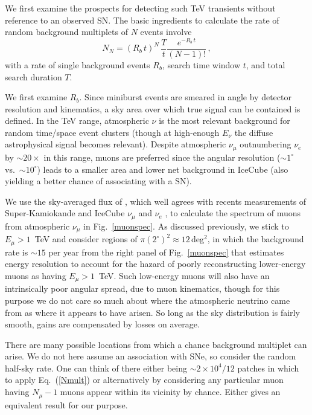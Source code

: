 \documentclass[aps,prd,nofootinbib,twocolumn,floatfix,letterpaper,superscriptaddress,showpacs]{revtex4}
\begin{document}
We first examine the prospects for detecting such TeV transients without reference to an observed SN.  The basic ingredients to calculate the rate of random background multiplets of $N$ events involve \cite{Ikeda:2007sa,Kistler2011}
%
\begin{equation}
       N_N \!=\! (R_b\,t)^N\,\frac{T}{t} \frac{e^{-R_b\,t}}{(N-1)!}
    \,,
\label{Nmult}
\end{equation}
%
with a rate of single background events $R_b$, search time window $t$, and total search duration $T$.

We first examine $R_b$.  Since miniburst events are smeared in angle by detector resolution and kinematics, a sky area over which true signal can be contained is defined.  In the TeV range, atmospheric $\nu$ is the most relevant background for random time/space event clusters (though at high-enough $E_\nu$ the diffuse astrophysical signal becomes relevant).  Despite atmospheric $\nu_\mu$ outnumbering $\nu_e$ by $\sim\! 20\times$ in this range, muons are preferred since the angular resolution ($\sim\! 1^\circ$ vs.\ $\sim\! 10^\circ$) leads to a smaller area and lower net background in IceCube (also yielding a better chance of associating with a SN).

We use the sky-averaged flux of \cite{Gaisser:2002jj}, which well agrees with recents measurements of Super-Kamiokande \cite{Richard:2015aua} and IceCube $\nu_\mu$ \cite{Abbasi:2010ie,Abbasi:2011jx} and $\nu_e$ \cite{Aartsen:2012uu,Aartsen:2015xup}, to calculate the spectrum of muons from atmospheric $\nu_\mu$ in Fig.~\ref{muonspec}.  As discussed previously, we stick to $E_\mu \!>\! 1$~TeV and consider regions of $\pi (2^\circ)^2 \!\approx\! 12\,$deg$^2$, in which the background rate is $\sim\! 15$ per year from the right panel of Fig.~\ref{muonspec} that estimates energy resolution to account for the hazard of poorly reconstructing lower-energy muons as having $E_\mu \!>\! 1$~TeV.  Such low-energy muons will also have an intrinsically poor angular spread, due to muon kinematics, though for this purpose we do not care so much about where the atmospheric neutrino came from as where it appears to have arisen.  So long as the sky distribution is fairly smooth, gains are compensated by losses on average.

There are many possible locations from which a chance background multiplet can arise.  We do not here assume an association with SNe, so consider the random half-sky rate.  One can think of there either being $\sim\! 2 \!\times\!10^4/12$ patches in which to apply Eq.~(\ref{Nmult}) or alternatively by considering any particular muon having $N_\mu \!-\! 1$ muons appear within its vicinity by chance.  Either gives an equivalent result for our purpose.
\end{document}
